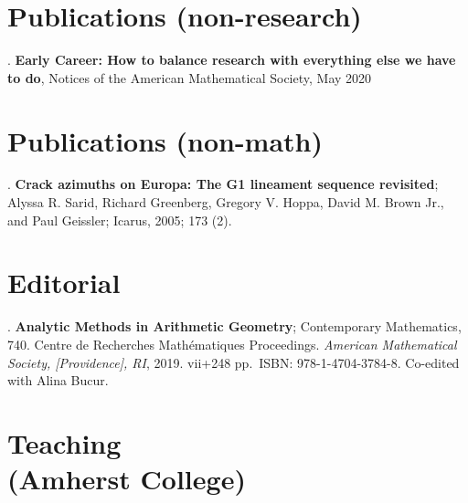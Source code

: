 \documentclass[margin,line]{res}
\newcounter{pubs}
\begin{document}
\begin{resume}



\section{\sc Publications (non-research)}
 . \textbf{Early Career: How to balance research with everything else we have to do}, Notices of the American Mathematical Society, May 2020



\section{\sc Publications (non-math)}

 .  \textbf{Crack azimuths on Europa: The G1 lineament sequence revisited}; Alyssa R. Sarid, Richard Greenberg, Gregory V. Hoppa, David M. Brown Jr., and Paul Geissler; Icarus, 2005; 173 (2). \vspace{.08cm}\\ 


\section{\sc Editorial}


 .  \textbf{Analytic Methods in Arithmetic Geometry}; Contemporary
Mathematics, 740. Centre de Recherches Math\'ematiques Proceedings. \emph{American Mathematical Society, [Providence], RI}, 2019. vii+248 pp.~ISBN: 978-1-4704-3784-8. Co-edited with Alina Bucur. \vspace{.08cm}\\ 



\vspace{-7pt}
\section{\sc Teaching \\ (Amherst College)}


\end{resume}
\end{document}
